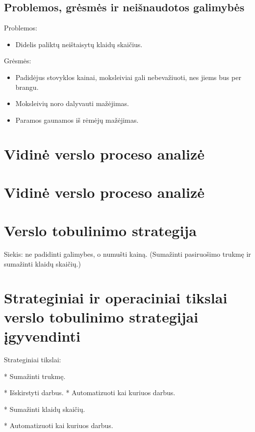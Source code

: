 \subsection{Problemos, grėsmės ir neišnaudotos galimybės}

Problemos:
\begin{itemize}
  \item Didelis paliktų neištaisytų klaidų skaičius.
\end{itemize}

Grėsmės:
\begin{itemize}
  \item Padidėjus stovyklos kainai, moksleiviai gali nebevažiuoti, nes 
    jiems bus per brangu.
  \item Moksleivių noro dalyvauti mažėjimas.
  \item Paramos gaunamos iš rėmėjų mažėjimas. 
\end{itemize}


\section{Vidinė verslo proceso analizė}


\section{Vidinė verslo proceso analizė}

\section{Verslo tobulinimo strategija}

Siekis: ne padidinti galimybes, o numušti kainą. (Sumažinti 
pasiruošimo trukmę ir sumažinti klaidų skaičių.)


\section{Strateginiai ir operaciniai tikslai verslo tobulinimo %
  strategijai įgyvendinti}

Strateginiai tikslai:

* Sumažinti trukmę.

  * Išskirstyti darbus.
  * Automatizuoti kai kuriuos darbus.

* Sumažinti klaidų skaičių.

  * Automatizuoti kai kuriuos darbus.
